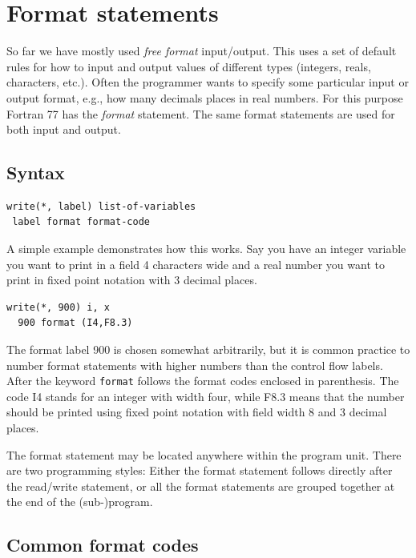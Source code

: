 \chapter{Format statements}
\label{chap:format}

So far we have mostly used \emph{free format} input/output. This uses a set of default rules for how to input and output values of different types (integers, reals, characters, etc.). Often the programmer wants to specify some particular input or output format, e.g., how many decimals places in real numbers. For this purpose Fortran 77 has the \emph{format} statement. The same format statements are used for both input and output.

\section{Syntax}

\begin{lstlisting}[style=fortran77]
      write(*, label) list-of-variables
 label format format-code
\end{lstlisting}

A simple example demonstrates how this works. Say you have an integer variable you want to print in a field 4 characters wide and a real number you want to print in fixed point notation with 3 decimal places.

\begin{lstlisting}[style=fortran77]
      write(*, 900) i, x
  900 format (I4,F8.3)
\end{lstlisting}

The format label 900 is chosen somewhat arbitrarily, but it is common practice to number format statements with higher numbers than the control flow labels. After the keyword \texttt{format} follows the format codes enclosed in parenthesis. The code I4 stands for an integer with width four, while F8.3 means that the number should be printed using fixed point notation with field width 8 and 3 decimal places.

The format statement may be located anywhere within the program unit. There are two programming styles: Either the format statement follows directly after the read/write statement, or all the format statements are grouped together at the end of the (sub-)program.

\section{Common format codes}

